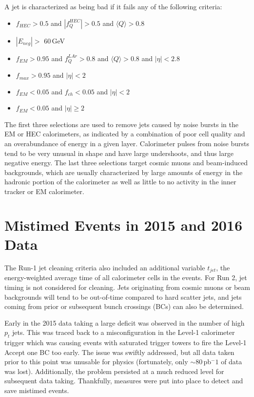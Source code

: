 A jet is characterized as being bad if it fails any of the following criteria:
\begin{itemize}[noitemsep]
	\item $f_{HEC} > 0.5$ and $|f^{HEC}_{Q}| > 0.5$ and $\langle Q \rangle > 0.8$
	\item $|E_{neg}| >$ 60\,GeV
	\item $f_{EM} > 0.95$ and $f^{LAr}_{Q} > 0.8$ and $\langle Q \rangle > 0.8$ and $|\eta| < 2.8$
	\item $f_{max} > 0.95$ and $|\eta| < 2$
	\item $f_{EM} < 0.05$ and $f_{ch} < 0.05$ and $|\eta| < 2$
	\item $f_{EM} < 0.05$ and $|\eta| \geq 2$
\end{itemize}

The first three selections are used to remove jets caused by noise bursts in the EM or HEC calorimeters, as indicated by a combination of poor cell quality and an overabundance of energy in a given layer.  Calorimeter pulses from noise bursts tend to be very unusual in shape and have large undershoots, and thus large negative energy.  The last three selections target cosmic muons and beam-induced backgrounds, which are usually characterized by large amounts of energy in the hadronic portion of the calorimeter as well as little to no activity in the inner tracker or EM calorimeter.

\section{Mistimed Events in 2015 and 2016 Data}

The Run-1 jet cleaning criteria also included an additional variable $t_{jet}$, the energy-weighted average time of all calorimeter cells in the events.  For Run 2, jet timing is not considered for cleaning.  Jets originating from cosmic muons or beam backgrounds will tend to be out-of-time compared to hard scatter jets, and jets coming from prior or subsequent bunch crossings (BCs) can also be determined.

Early in the 2015 data taking a large deficit was observed in the number of high $p_t$ jets.  This was traced back to a misconfiguration in the Level-1 calorimeter trigger which was causing events with saturated trigger towers to fire the Level-1 Accept one BC too early.  The issue was swiftly addressed, but all data taken prior to this point was unusable for physics (fortunately, only $\sim$80\,pb$^-1$ of data was lost).  Additionally, the problem persisted at a much reduced level for subsequent data taking.  Thankfully, measures were put into place to detect and save mistimed events.

